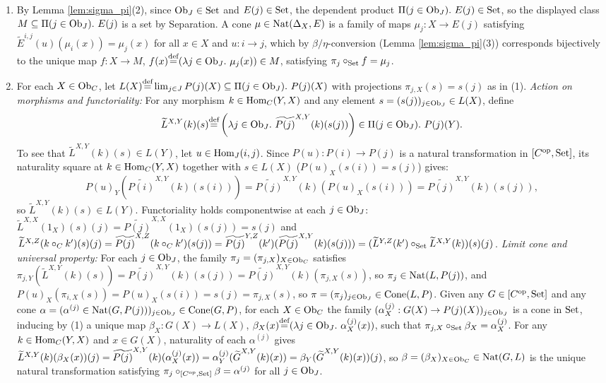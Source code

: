 \documentclass[10pt,a4paper]{article}
\begin{document}
\begin{enumerate}
\item By Lemma \ref{lem:sigma_pi}(2), since ${\textrm{Ob}}_J \in {\textrm{Set}}$ and $E(j) \in {\textrm{Set}}$, the dependent product $\Pi(j \in {\textrm{Ob}}_J).\ E(j) \in {\textrm{Set}}$, so the displayed class $M \subseteq \Pi(j \in {\textrm{Ob}}_J).\ E(j)$ is a set by Separation. A cone $\mu \in {\textrm{Nat}}(\Delta_X, E)$ is a family of maps $\mu_j : X \to E(j)$ satisfying $\widetilde{E}^{i,j}(u)(\mu_i(x)) = \mu_j(x)$ for all $x \in X$ and $u : i \to j$, which by $\beta/\eta$-conversion (Lemma \ref{lem:sigma_pi}(3)) corresponds bijectively to the unique map $f : X \to M$, $f(x) {\stackrel{{\textrm{def}}}{=}} (\lambda j \in {\textrm{Ob}}_J.\ \mu_j(x)) \in M$, satisfying $\pi_j \circ_{\textrm{Set}} f = \mu_j$.
\item For each $X \in {\textrm{Ob}}_C$, let $L(X) {\stackrel{{\textrm{def}}}{=}} \lim_{j \in J} P(j)(X) \subseteq \Pi(j \in {\textrm{Ob}}_J).\ P(j)(X)$ with projections $\pi_{j,X}(s) = s(j)$ as in (1).
\emph{Action on morphisms and functoriality:} For any morphism $k \in {\textrm{Hom}}_C(Y, X)$ and any element $s = (s(j))_{j \in {\textrm{Ob}}_J} \in L(X)$, define
$$\widetilde{L}^{X,Y}(k)(s) {\stackrel{{\textrm{def}}}{=}} \left(\lambda j \in {\textrm{Ob}}_J.\ \widetilde{P(j)}^{X,Y}(k)(s(j))\right) \in \Pi(j \in {\textrm{Ob}}_J).\ P(j)(Y).$$
To see that $\widetilde{L}^{X,Y}(k)(s) \in L(Y)$, let $u \in {\textrm{Hom}}_J(i, j)$. Since $P(u) : P(i) \to P(j)$ is a natural transformation in $[C^{\textrm{op}}, {\textrm{Set}}]$, its naturality square at $k \in {\textrm{Hom}}_C(Y, X)$ together with $s \in L(X)$ ($P(u)_X(s(i)) = s(j)$) gives:
$$P(u)_Y\left(\widetilde{P(i)}^{X,Y}(k)(s(i))\right) = \widetilde{P(j)}^{X,Y}(k)\left(P(u)_X(s(i))\right) = \widetilde{P(j)}^{X,Y}(k)(s(j)),$$
so $\widetilde{L}^{X,Y}(k)(s) \in L(Y)$. Functoriality holds componentwise at each $j \in {\textrm{Ob}}_J$: $\widetilde{L}^{X,X}(1_X)(s)(j) = \widetilde{P(j)}^{X,X}(1_X)(s(j)) = s(j)$ and $\widetilde{L}^{X,Z}(k \circ_C k')(s)(j) = \widetilde{P(j)}^{X,Z}(k \circ_C k')(s(j)) = \widetilde{P(j)}^{Y,Z}(k')(\widetilde{P(j)}^{X,Y}(k)(s(j))) = (\widetilde{L}^{Y,Z}(k') \circ_{\textrm{Set}} \widetilde{L}^{X,Y}(k))(s)(j)$.
\emph{Limit cone and universal property:} For each $j \in {\textrm{Ob}}_J$, the family $\pi_j = (\pi_{j,X})_{X \in {\textrm{Ob}}_C}$ satisfies $\pi_{j,Y}(\widetilde{L}^{X,Y}(k)(s)) = \widetilde{P(j)}^{X,Y}(k)(s(j)) = \widetilde{P(j)}^{X,Y}(k)(\pi_{j,X}(s))$, so $\pi_j \in {\textrm{Nat}}(L, P(j))$, and $P(u)_X(\pi_{i,X}(s)) = P(u)_X(s(i)) = s(j) = \pi_{j,X}(s)$, so $\pi = (\pi_j)_{j \in {\textrm{Ob}}_J} \in {\mathrm{Cone}}(L, P)$. Given any $G \in [C^{\textrm{op}}, {\textrm{Set}}]$ and any cone $\alpha = (\alpha^{(j)} \in {\textrm{Nat}}(G, P(j)))_{j \in {\textrm{Ob}}_J} \in {\mathrm{Cone}}(G, P)$, for each $X \in {\textrm{Ob}}_C$ the family $(\alpha^{(j)}_X : G(X) \to P(j)(X))_{j \in {\textrm{Ob}}_J}$ is a cone in ${\textrm{Set}}$, inducing by (1) a unique map $\beta_X : G(X) \to L(X)$, $\beta_X(x) \eqdef (\lambda j \in \Ob_J.\ \alpha^{(j)}_X(x))$, such that $\pi_{j,X} \circ_{\textrm{Set}} \beta_X = \alpha^{(j)}_X$. For any $k \in {\textrm{Hom}}_C(Y, X)$ and $x \in G(X)$, naturality of each $\alpha^{(j)}$ gives $\widetilde{L}^{X,Y}(k)(\beta_X(x))(j) = \widetilde{P(j)}^{X,Y}(k)(\alpha^{(j)}_X(x)) = \alpha^{(j)}_Y({\widetilde{G}\textrm{}}^{X,Y}(k)(x)) = \beta_Y({\widetilde{G}\textrm{}}^{X,Y}(k)(x))(j)$, so $\beta = (\beta_X)_{X \in {\textrm{Ob}}_C} \in {\textrm{Nat}}(G, L)$ is the unique natural transformation satisfying $\pi_j \circ_{[C^{\textrm{op}},{\textrm{Set}}]} \beta = \alpha^{(j)}$ for all $j \in {\textrm{Ob}}_J$.

\end{enumerate}
\end{document}

